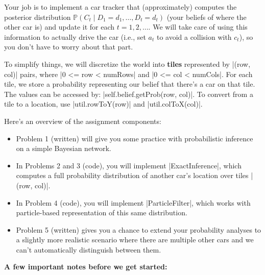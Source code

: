 Your job is to implement a car tracker that (approximately) computes the
posterior distribution $\mathbb P(C_t \mid D_1 = d_1, \dots, D_t = d_t)$ (your
beliefs of where the other car is) and update it for each $t = 1, 2, \dots$.  We
will take care of using this information to actually drive the car (i.e., set
$a_t$ to avoid a collision with $c_t$), so you don't have to worry about that
part.

To simplify things, we will discretize the world into {\bf tiles} represented by
|(row, col)| pairs, where |0 <= row < numRows| and |0 <= col < numCols|. For
each tile, we store a probability representing our belief that there's a car on
that tile. The values can be accessed by: |self.belief.getProb(row, col)|. To
convert from a tile to a location, use |util.rowToY(row)| and
|util.colToX(col)|.

Here's an overview of the assignment components:
  
\begin{itemize}
  \item Problem 1 (written) will give you some practice with probabilistic
  inference on a simple Bayesian network.
  \item In Problems 2 and 3 (code), you will implement |ExactInference|, which
  computes a full probability distribution of another car's location over tiles
  |(row, col)|.
  \item In Problem 4 (code), you will implement |ParticleFilter|, which works
  with particle-based representation of this same distribution.
  \item Problem 5 (written) gives you a chance to extend your probability analyses
  to a slightly more realistic scenario where there are multiple other cars and
  we can't automatically distinguish between them.
\end{itemize}
\clearpage

{\bf A few important notes before we get started: }  

